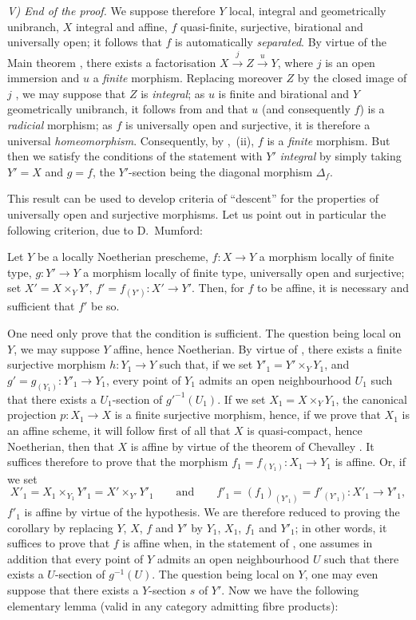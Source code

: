 \emph{V) End of the proof.}
We suppose therefore $Y$ local, integral and geometrically unibranch, $X$ integral and affine, $f$ quasi-finite, surjective, birational and universally open; it follows that $f$ is automatically \emph{separated}.
By virtue of the Main theorem , there exists a factorisation $X\xrightarrow{j}Z\xrightarrow{u}Y$, where $j$ is an open immersion and $u$ a \emph{finite} morphism.
Replacing moreover $Z$ by the closed image of $j$ , we may suppose that $Z$ is \emph{integral}; as $u$ is finite and birational and $Y$ geometrically unibranch, it follows from  and  that $u$ (and consequently $f$) is a \emph{radicial} morphism; as $f$ is universally open and surjective, it is therefore a universal \emph{homeomorphism}.
Consequently, by ,~(ii), $f$ is a \emph{finite} morphism.
But then we satisfy the conditions of the statement with $Y'$ \emph{integral} by simply taking $Y'=X$ and $g=f$, the $Y'$-section being the diagonal morphism $\Delta_f$.

This result can be used to develop criteria of ``descent'' for the properties of universally open and surjective morphisms.
Let us point out in particular the following criterion, due to D.\ Mumford:

\begin{corollary}[14.5.11]
\label{IV.14.5.11}
Let $Y$ be a locally Noetherian prescheme, $f:X\to Y$ a morphism locally of finite type, $g:Y'\to Y$ a morphism locally of finite type, universally open and surjective; set $X'=X\times_Y Y'$, $f'=f_{(Y')}:X'\to Y'$.
Then, for $f$ to be affine, it is necessary and sufficient that $f'$ be so.
\end{corollary}

One need only prove that the condition is sufficient.
The question being local on $Y$, we may suppose $Y$ affine, hence Noetherian.
By virtue of , there exists a finite surjective morphism $h:Y_1\to Y$ such that, if we set $Y'_1=Y'\times_Y Y_1$, and $g'=g_{(Y_1)}:Y'_1\to Y_1$, every point of $Y_1$ admits an open neighbourhood $U_1$ such that there exists a $U_1$-section of $g'^{-1}(U_1)$.
If we set $X_1=X\times_Y Y_1$, the canonical projection $p:X_1\to X$ is a finite surjective morphism, hence, if we prove that $X_1$ is an affine scheme, it will follow first of all that $X$ is quasi-compact, hence Noetherian, then that $X$ is affine by virtue of the theorem of Chevalley .
It suffices therefore to prove that the morphism $f_1=f_{(Y_1)}:X_1\to Y_1$ is affine.
Or, if we set
\[
  X'_1=X_1\times_{Y_1}Y'_1=X'\times_{Y'}Y'_1 \qquad\text{and}\qquad f'_1=(f_1)_{(Y'_1)}=f'_{(Y'_1)}:X'_1\to Y'_1,
\]
$f'_1$ is affine by virtue of the hypothesis.
We are therefore reduced to proving the corollary by replacing $Y$, $X$, $f$ and $Y'$ by $Y_1$, $X_1$, $f_1$ and $Y'_1$; in other words, it suffices to prove that $f$ is affine when, in the statement of , one assumes in addition that every point of $Y$ admits an open neighbourhood $U$ such that there exists a $U$-section of $g^{-1}(U)$.
The question being local on $Y$, one may even suppose that there exists a $Y$-section $s$ of $Y'$.
Now we have the following elementary lemma (valid in any category admitting fibre products):

